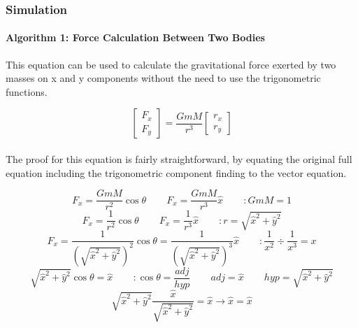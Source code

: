 \subsubsection{Simulation}
\paragraph{Algorithm 1: Force Calculation Between Two Bodies}
This equation can be used to calculate the gravitational force exerted by two masses on x and y components without the need to use the trigonometric functions.

$$\begin{bmatrix} F_x \\ F_y \end{bmatrix} = \frac{GmM}{r^3} \begin{bmatrix} r_x \\ r_y \end{bmatrix}$$

\paragraph{}
The proof for this equation is fairly straightforward, by equating the original full equation including the trigonometric component finding to the vector equation.

$$F_x=\frac{GmM}{r^2}\cos\theta \hspace{25pt} F_x=\frac{GmM}{r^3}\hat{x} \hspace{25pt} : GmM = 1 $$ 
\vspace{10pt}
$$F_x=\frac{1}{r^2}\cos\theta \hspace{25pt} F_x=\frac{1}{r^3}\hat{x} \hspace{25pt} : r=\sqrt{\hat{x}^2+\hat{y}^2}$$ 
\vspace{10pt}
$$F_x=\frac{1}{(\sqrt{\hat{x}^2+\hat{y}^2})^2}\cos\theta = \frac{1}{(\sqrt{\hat{x}^2+\hat{y}^2})^3}\hat{x} \hspace{25pt} : \frac{1}{x^2} \div \frac{1}{x^3}  = x$$
\vspace{10pt}
$$\sqrt{\hat{x}^2+\hat{y}^2}\cos\theta=\hat{x} \hspace{25pt} : \cos\theta=\frac{adj}{hyp} \hspace{25pt} adj=\hat{x} \hspace{25pt} hyp=\sqrt{\hat{x}^2+\hat{y}^2}$$
\vspace{10pt}
$$\sqrt{\hat{x}^2+\hat{y}^2}\frac{\hat{x}}{\sqrt{\hat{x}^2+\hat{y}^2}}=\hat{x} \rightarrow \hat{x} = \hat{x}$$

